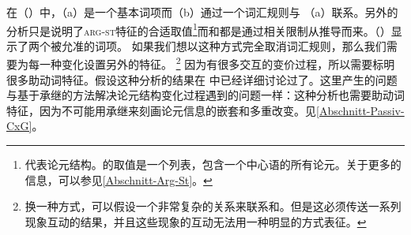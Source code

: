 \eal
\ex {}
\ex {}
\zl
在（）中，（a）是一个基本词项而（b）通过一个词汇规则与 （a）联系。另外的分析只是说明了\textsc{arg-st}特征的合适取值\footnote{%
\argstc 代表论元结构。\argstc 的取值是一个列表，包含一个中心语的所有论元。关于\argstc 更多的信息，可以参见\ref{Abschnitt-Arg-St}。
}而\subcatc 和\slashvc 都是通过相关限制从\argstvc 推导而来。（）显示了两个被允准的词项。
\eal
\ex {}
\ex {}
\zl
如果我们想以这种方式完全取消词汇规则，那么我们需要为每一种变化设置另外的特征。 \footnote{%
换一种方式，可以假设一个非常复杂的关系来联系\argstc 和\subcatc。但是这必须传送一系列现象互动的结果，并且这些现象的互动无法用一种明显的方式表征。%
} 因为有很多交互的变价过程，所以需要标明很多助动词特征。假设这种分析的结果在 中已经详细讨论过了。这里产生的问题与基于承继的方法解决论元结构变化过程遇到的问题一样：这种分析也需要助动词特征，因为不可能用承继来刻画论元信息的嵌套和多重改变。见\ref{Abschnitt-Passiv-CxG}。
